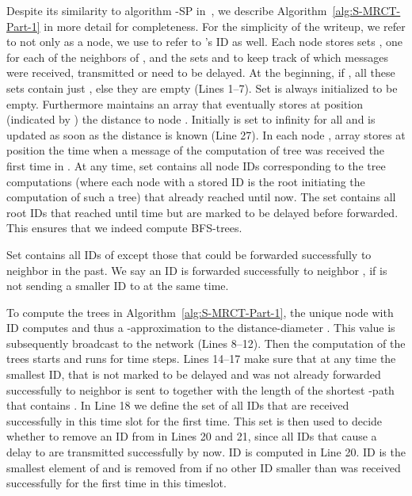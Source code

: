 \documentclass[11pt]{article}
\begin{document}
Despite its similarity to algorithm -SP in~\cite{holzer2012optimal}, we describe Algorithm~\ref{alg:S-MRCT-Part-1} in more detail for completeness. For the simplicity of the writeup, we refer to  not only as a node, we use  to refer to 's ID as well. Each node  stores  sets , one for each of the  neighbors  of , and the sets   and  to keep track of which messages were received, transmitted or need to be delayed. At the beginning, if , all these sets contain just , else they are empty (Lines 1--7). Set  is always initialized to be empty. Furthermore  maintains an array  that eventually stores at position  (indicated by ) the distance  to node . Initially  is set to infinity for all  and is updated as soon as the distance is known (Line 27). In each node , array  stores at position  the time when a message of the computation of tree  was received the first time in . At any time, set  contains all node IDs corresponding to the tree computations (where each node with a stored ID is the root initiating the computation of such a tree) that already reached  until now.
The set  contains all root IDs that reached  until time  but are marked to be delayed before forwarded. This ensures that we indeed compute BFS-trees.

Set  contains all IDs of  except those that could be forwarded successfully to neighbor  in the past. We say an ID  is forwarded successfully to neighbor , if  is not sending a smaller ID  to  at the same time.

To compute the trees in Algorithm~\ref{alg:S-MRCT-Part-1}, the unique node with ID  computes  and thus a -approximation to the distance-diameter . This value is subsequently broadcast to the network (Lines 8--12). Then the computation of the  trees starts and runs for  time steps. Lines 14--17 make sure that at any time the smallest ID, that is not marked to be delayed and was not already  forwarded successfully to neighbor  is sent to  together with the length of the shortest -path that contains . In Line 18 we define the set  of all IDs that are received successfully in this time slot for the first time. This set is then used to decide whether to remove an ID  from  in Lines 20 and 21, since all IDs that cause a delay to  are transmitted successfully by now. ID  is computed in Line 20. ID  is the smallest element of  and is removed from  if no other ID smaller than  was received successfully for the first time in this timeslot.
\end{document}
